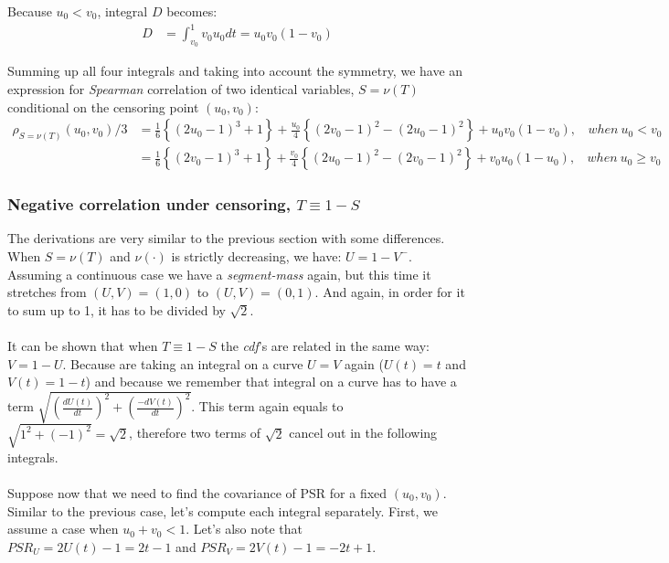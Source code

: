 \documentclass[]{article}
\begin{document}
Because $u_0 < v_0$,  integral $D$ becomes:
	$$
	\begin{aligned}
    D &= \int_{v_0}^{1} v_0 u_0 dt = u_0 v_0 (1 - v_0)
	\end{aligned}
	$$

Summing up all four integrals and taking into account the symmetry, we have an expression for \emph{Spearman} correlation of two identical variables, $S = \nu( T)$ conditional on the censoring point $(u_0, v_0)$:
	$$
	\begin{aligned}
    \rho_{S = \nu( T)}(u_0, v_0)/3 &= \frac{1}{6}\left\{  (2u_0 - 1)^3 +1\right\} +  \frac{u_0}{4}\left\{  (2v_0 - 1)^2 -(2u_0 - 1)^2 \right\} + u_0 v_0 (1 - v_0), ~~~~when~u_0 < v_0\\
    &= \frac{1}{6}\left\{  (2v_0 - 1)^3 +1\right\} +  \frac{v_0}{4}\left\{  (2u_0 - 1)^2 -(2v_0 - 1)^2 \right\} + v_0 u_0 (1 - u_0), ~~~~when~u_0 \geq v_0
	\end{aligned}
	$$


\subsubsection{Negative correlation under censoring, $T\equiv 1-S$}
The derivations are very similar to the previous section with some differences. When $S = \nu( T)$ and $\nu(\cdot)$ is strictly decreasing, we have: $U = 1-V^-$. Assuming a continuous case we have a \emph{segment-mass} again, but this time it stretches from $(U,V) = (1,0)$ to $(U,V) = (0,1)$. And again, in order for it to sum up to 1, it has to be divided by $\sqrt{2}$.\\
~\\
It can be shown that when $T\equiv 1-S$ the \emph{cdf}'s are related in the same way: $V = 1-U$. Because are taking an integral on a curve $U=V$ again ($U(t) = t$ and $V(t)=1-t$) and because we remember that integral on a curve has to have a term $\sqrt{\left(\frac{dU(t)}{dt}\right)^2 + \left(\frac{-dV(t)}{dt}\right)^2}$. This term again equals to $\sqrt{1^2 + (-1)^2} = \sqrt{2}$, therefore two terms of $\sqrt{2}$ cancel out in the following integrals.\\
~\\
Suppose now that we need to find the covariance of PSR for a fixed $(u_0, v_0)$. Similar to the previous case, let's compute each integral separately. First, we assume a case when $u_0 + v_0 < 1$. Let's also note that $PSR_U = 2U(t) - 1 = 2t - 1$ and $PSR_V = 2V(t) - 1 = -2t + 1$.
\end{document}
